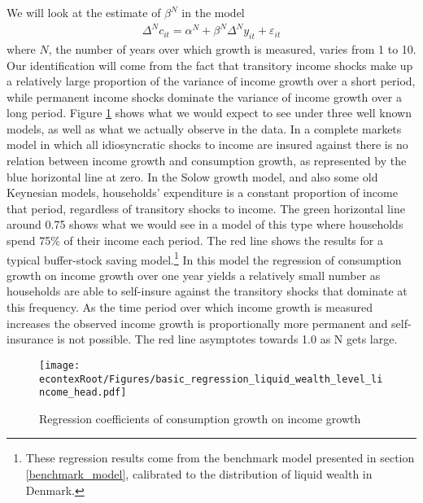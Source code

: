 \documentclass[titlepage]{\econtex}\newcommand{\texname}{ConsumptionHeterogeneity}
\begin{document}
We will look at the estimate of $\beta^N$ in the model
\begin{align*}
    \Delta^N c_{it} = \alpha^N + \beta^N \Delta^N y_{it} + \varepsilon_{it}
\end{align*}
where $N$, the number of years over which growth is measured, varies from 1 to 10. Our identification will come from the fact that transitory income shocks make up a relatively large proportion of the variance of income growth over a short period, while permanent income shocks dominate the variance of income growth over a long period. Figure \ref{fig:GrowthReg} shows what we would expect to see under three well known models, as well as what we actually observe in the data. In a complete markets model in which all idiosyncratic shocks to income are insured against there is no relation between income growth and consumption growth, as represented by the blue horizontal line at zero. In the Solow growth model, and also some old Keynesian models, households' expenditure is a constant proportion of income that period, regardless of transitory shocks to income. The green horizontal line around 0.75 shows what we would see in a model of this type where households spend 75\% of their income each period. The red line shows the results for a typical buffer-stock saving model.\footnote{These regression results come from the benchmark model presented in section \ref{benchmark_model}, calibrated to the distribution of liquid wealth in Denmark.} In this model the regression of consumption growth on income growth over one year yields a relatively small number as households are able to self-insure against the transitory shocks that dominate at this frequency. As the time period over which income growth is measured increases the observed income growth is proportionally more permanent and self-insurance is not possible. The red line asymptotes towards 1.0 as N gets large.
	\begin{figure} 
	\begin{centering}
		\texttt{[image: \\econtexRoot/Figures/basic\_regression\_liquid\_wealth\_level\_lincome\_head.pdf]}
		\caption{Regression coefficients of consumption growth on income growth}
		\label{fig:GrowthReg}
	\end{centering}
\end{figure}
\end{document}
